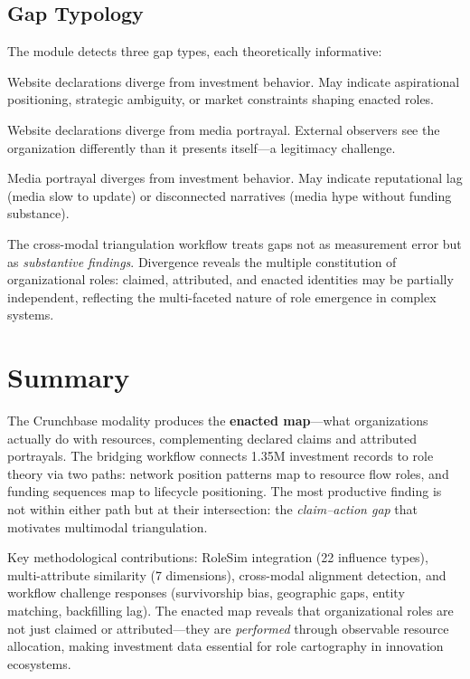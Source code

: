 \documentclass[../main.tex]{subfiles}
\begin{document}
\subsection{Gap Typology}

The module detects three gap types, each theoretically informative:

\begin{description}[leftmargin=0.5cm, itemsep=0.3em]
\item[Claim-Action Gap.]
Website declarations diverge from investment behavior.
May indicate aspirational positioning, strategic ambiguity,
or market constraints shaping enacted roles.

\item[Claim-Perception Gap.]
Website declarations diverge from media portrayal.
External observers see the organization differently than
it presents itself---a legitimacy challenge.

\item[Perception-Action Gap.]
Media portrayal diverges from investment behavior.
May indicate reputational lag (media slow to update)
or disconnected narratives (media hype without funding substance).
\end{description}

\begin{insightbox}
The cross-modal triangulation workflow treats gaps not as measurement error
but as \emph{substantive findings}.
Divergence reveals the multiple constitution of organizational roles:
claimed, attributed, and enacted identities may be partially independent,
reflecting the multi-faceted nature of role emergence in complex systems.
\end{insightbox}


\section{Summary}

\begin{summarybox}
The Crunchbase modality produces the \textbf{enacted map}---what organizations
actually do with resources, complementing declared claims and attributed portrayals.
The bridging workflow connects 1.35M investment records to role theory via
two paths: network position patterns map to resource flow roles,
and funding sequences map to lifecycle positioning.
The most productive finding is not within either path but at their intersection:
the \emph{claim--action gap} that motivates multimodal triangulation.

Key methodological contributions:
RoleSim integration (22 influence types),
multi-attribute similarity (7 dimensions),
cross-modal alignment detection,
and workflow challenge responses (survivorship bias, geographic gaps,
entity matching, backfilling lag).
The enacted map reveals that organizational roles are not just claimed or attributed---they
are \emph{performed} through observable resource allocation,
making investment data essential for role cartography in innovation ecosystems.
\end{summarybox}

\clearpage
{}
\end{document}
